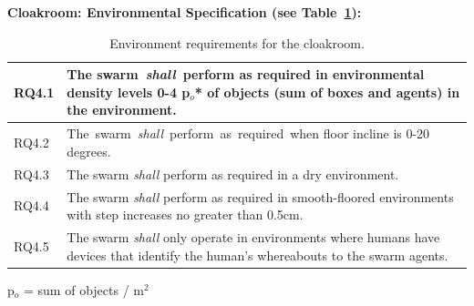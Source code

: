 \documentclass[lettersize,journal]{IEEEtran}
\begin{document}
\noindent \textbf{Cloakroom: Environmental Specification (see Table~\ref{tab:environment}):}
\begin{table}[!h]
	\centering
	\begin{tabular}{|p{7mm}|p{72mm}|}
		\hline
		RQ4.1 & The swarm \emph{shall} perform as required in environmental density levels 0-4 \textbf{p$_o$* of objects (sum of boxes and agents)} in the environment.
		\\ 
		\hline
		RQ4.2 & The swarm \emph{shall} perform as required when floor incline is 0-20 degrees.
		\\ 
		\hline
		RQ4.3 & The swarm \emph{shall} perform as required in a dry environment.
		\\ 
		\hline
		RQ4.4 & The swarm \emph{shall} perform as required in smooth-floored environments with step increases no greater than 0.5cm.
		\\ 
		\hline
		RQ4.5 & The swarm \emph{shall} only operate in environments where humans have devices that identify the human’s whereabouts to the swarm agents.
		\\		[1ex] 		
		\hline
	\end{tabular}
	\caption{\label{tab:environment}Environment requirements for the cloakroom.}
\end{table}   
\noindent *p$_o$ = sum of objects  / m$^2$
\end{document}
